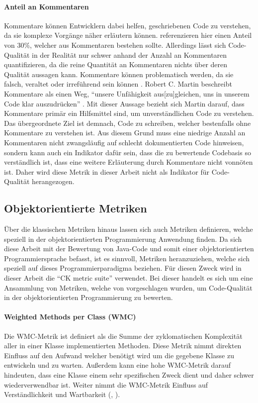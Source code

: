 \documentclass[a4paper, 12pt]{article}
\begin{document}
\paragraph{Anteil an Kommentaren}
Kommentare können Entwicklern dabei helfen, geschriebenen Code zu verstehen, da sie komplexe Vorgänge näher erläutern können. 
\textcite{Linda_softwarequality} referenzieren hier einen Anteil von 30\%, welcher aus Kommentaren bestehen sollte.
Allerdings lässt sich Code-Qualität in der Realität nur schwer anhand der Anzahl an Kommentaren quantifizieren, da die reine Quantität an Kommentaren nichts über deren Qualität aussagen kann.
Kommentare können problematisch werden, da sie falsch, veraltet oder irreführend sein können \parencites[85]{Martin2009}.
Robert C. Martin beschreibt Kommentare als einen Weg, \enquote{unsere Unfähigkeit aus[zu]gleichen, uns in unserem Code klar auszudrücken} \parencites[85]{Martin2009}.
Mit dieser Aussage bezieht sich Martin darauf, dass Kommentare primär ein Hilfsmittel sind, um unverständlichen Code zu verstehen.
Das übergeordnete Ziel ist demnach, Code zu schreiben, welcher bestenfalls ohne Kommentare zu verstehen ist.
Aus diesem Grund muss eine niedrige Anzahl an Kommentaren nicht zwangsläufig auf schlecht dokumentierten Code hinweisen, sondern kann auch ein Indikator dafür sein, dass die zu bewertende Codebasis so verständlich ist, dass eine weitere Erläuterung durch Kommentare nicht vonnöten ist.
Daher wird diese Metrik in dieser Arbeit nicht als Indikator für Code-Qualität herangezogen.

\subsection{Objektorientierte Metriken}
Über die klassischen Metriken hinaus lassen sich auch Metriken definieren, welche speziell in der objektorientierten Programmierung Anwendung finden.
Da sich diese Arbeit mit der Bewertung von Java-Code und somit einer objektorientierten Programmiersprache befasst, ist es sinnvoll, Metriken heranzuziehen, welche sich speziell auf dieses Programmierparadigma beziehen.
Für diesen Zweck wird in dieser Arbeit die \enquote{CK metric suite} verwendet.
Bei dieser handelt es sich um eine Ansammlung von Metriken, welche von \textcite{Metrics_OO_design} vorgeschlagen wurden, um Code-Qualität in der objektorientierten Programmierung zu bewerten.

\paragraph{Weighted Methods per Class (WMC)}
Die WMC-Metrik ist definiert als die Summe der zyklomatischen Komplexität aller in einer Klasse implementierten Methoden.
Diese Metrik nimmt direkten Einfluss auf den Aufwand welcher benötigt wird um die gegebene Klasse zu entwickeln und zu warten.
Außerdem kann eine hohe WMC-Metrik darauf hindeuten, dass eine Klasse einem sehr spezifischen Zweck dient und daher schwer wiederverwendbar ist. 
Weiter  nimmt die WMC-Metrik Einfluss auf Verständlichkeit und Wartbarkeit (\textcite{Metrics_OO_design}, \textcite{Linda_softwarequality}).
\end{document}
